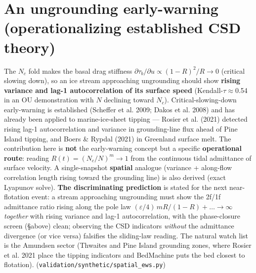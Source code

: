 \documentclass[tc, manuscript]{copernicus}
\begin{document}
\section{An ungrounding early-warning (operationalizing established CSD theory)}

The $N_{c}$ fold makes the basal drag stiffness $\partial \tau _{b}/\partial u\propto (1-R)^{2}/R\to 0$ (critical slowing down), so an ice stream approaching ungrounding should show \textbf{rising variance and lag-1 autocorrelation of its surface speed} (Kendall-\ensuremath{\tau}\ensuremath{\approx}0.54 in an OU demonstration with $N$ declining toward $N_{c}$). Critical-slowing-down early-warning is established (Scheffer et al. 2009; Dakos et al. 2008) and has already been applied to marine-ice-sheet tipping — Rosier et al. (2021) detected rising lag-1 autocorrelation and variance in grounding-line flux ahead of Pine Island tipping, and Boers \& Rypdal (2021) in Greenland surface melt. The contribution here is \textbf{not} the early-warning concept but a specific \textbf{operational route}: reading $R(t)=(N_{c}/N)^{m}\to 1$ from the continuous tidal admittance of surface velocity. A single-snapshot \textbf{spatial} analogue (variance + along-flow correlation length rising toward the grounding line) is also derived (exact Lyapunov solve). \textbf{The discriminating prediction} is stated for the next near-flotation event: a stream approaching ungrounding must show the 2f/1f admittance ratio rising along the pole law $(\varepsilon /4)\,mR/(1-R)+\ldots \to \infty $ \emph{together} with rising variance and lag-1 autocorrelation, with the phase-closure screen (§above) clean; observing the CSD indicators \emph{without} the admittance divergence (or vice versa) falsifies the sliding-law reading. The natural watch list is the Amundsen sector (Thwaites and Pine Island grounding zones, where Rosier et al. 2021 place the tipping indicators and BedMachine puts the bed closest to flotation). (\texttt{validation/\allowbreak{}synthetic/\allowbreak{}spatial\_\allowbreak{}ews.\allowbreak{}py})
\end{document}
